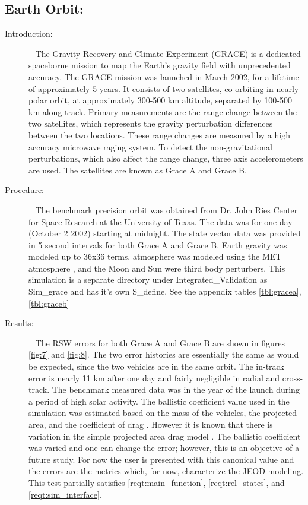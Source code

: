 \subsection{Earth Orbit:}
\label{test:grace}
\begin{description}
\item[Introduction:] \ \newline
The Gravity Recovery and Climate Experiment (GRACE) is a dedicated spaceborne mission
to map the Earth's gravity field with unprecedented accuracy. The GRACE mission was
launched in March 2002, for a lifetime of approximately 5 years. It consists of two satellites,
co-orbiting in nearly polar orbit, at approximately 300-500 km altitude, separated by 100-500 km
along track. Primary measurements are the range change between the two satellites, which represents
the gravity perturbation differences between the two locations. These range changes are measured
by a high accuracy microwave raging system. To detect the non-gravitational perturbations, which
also affect the range change, three axis accelerometers are used. The satellites are known as Grace A and Grace B.
\item[Procedure:]\ \newline
The benchmark precision orbit was obtained from Dr. John Ries \cite{JR} Center for Space Research
at the University of Texas. The data was for one day (October 2 2002) starting at midnight. The
state vector data was provided in 5 second intervals for both Grace A and Grace B. Earth gravity
was modeled up to 36x36 terms, atmosphere was modeled using the MET atmosphere , and the Moon and
Sun were third body perturbers. This simulation is a separate directory under Integrated\_Validation
as Sim\_grace and has it's own S\_define. See the appendix tables \ref{tbl:gracea}, \ref{tbl:graceb}
\item[Results:]\ \newline
The RSW errors for both Grace A and Grace B are shown in figures \ref{fig:7} and  \ref{fig:8}. The
two error histories are essentially the same as would be expected, since the two vehicles are in the
same orbit. The in-track error is nearly 11 km after one day and fairly negligible in radial and
cross-track. The benchmark measured data was in the year of the launch during a period of high solar
activity. The ballistic coefficient value used in the simulation was estimated based on the mass of the
vehicles, the projected area, and the coefficient of drag \cite{JR}. However it is known that there is
variation in the simple projected area drag model \cite{maz}. The ballistic coefficient was varied and
one can change the error; however, this is an objective of a future study. For now the user is presented
with this canonical value and the errors are the metrics which, for now, characterize the JEOD modeling.
This test partially satisfies \ref{reqt:main_function}, \ref{reqt:rel_states}, and \ref{reqt:sim_interface}.


\end{description}
